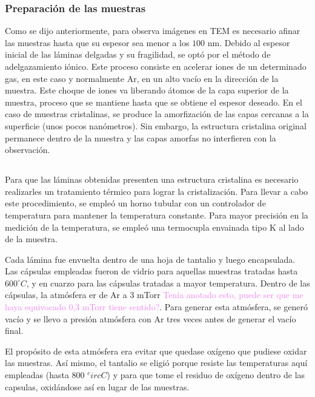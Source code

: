 \documentclass[12pt]{article}
\theoremstyle{definition}
\theoremstyle{remark}
\begin{document}
{\subsubsection{Preparación de las muestras}

Como se dijo anteriormente, para observa imágenes en TEM es necesario afinar las muestras hasta que su espesor sea menor a los $100$ nm. Debido al espesor inicial de las láminas delgadas y su fragilidad, se optó por el método de adelgazamiento iónico. Este proceso consiste en acelerar iones de un determinado gas, en este caso y normalmente Ar, en un alto vacío en la dirección de la muestra. Este choque de iones va liberando átomos de la capa superior de la muestra, proceso que se mantiene hasta que se obtiene el espesor deseado. En el caso de muestras cristalinas, se produce la amorfización de las capas cercanas a la superficie (unos pocos nanómetros). Sin embargo, la estructura cristalina original permanece dentro de la muestra y las capas amorfas no interfieren con la observación. 
 

\subsection{}

Para que las láminas obtenidas presenten una estructura cristalina es necesario realizarles un tratamiento térmico para lograr la cristalización. Para llevar a cabo este procedimiento, se empleó un horno tubular con un controlador de temperatura para mantener la temperatura constante. Para mayor precisión en la medición de la temperatura, se empleó una termocupla envainada tipo K al lado de la muestra. 

Cada lámina fue envuelta dentro de una hoja de tantalio y luego encapsulada.
Las cápsulas empleadas fueron de vidrio para aquellas muestras tratadas hasta $600 ^\circ C$, y en cuarzo para las cápsulas tratadas a mayor temperatura. Dentro de las cápsulas, la atmósfera er de Ar a 3 mTorr \textcolor{violet}{Tenía anotado esto, puede ser que me haya equivocado 0,3 mTorr tiene sentido?}. Para generar esta atmósfera, se generó vacío y se llevo a presión atmósfera con Ar tres veces antes de generar el vacío final.

El propósito de esta atmósfera era evitar que quedase oxígeno que pudiese oxidar las muestras. Así mismo, el tantalio se eligió porque resiste las temperaturas aquí empleadas (hasta 800 $^circ C$) y para que tome el residuo de oxígeno dentro de las capsulas, oxidándose así en lugar de las muestras.

}
\end{document}
